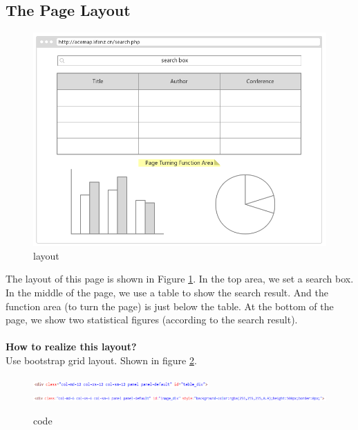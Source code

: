 \documentclass{article}
\begin{document}
	\subsection{The Page Layout}
	\begin{figure}[htb]
		\includegraphics[width=1.0\textwidth]{searchlayout.png}
		\caption{layout}
		\label{searchlayout}
	\end{figure}
	The layout of this page is shown in Figure \ref{searchlayout}. In the top area, we set a search box. In the middle of the page, we use a table to show the search result. And the function area (to turn the page) is just below the table. At the bottom of the page, we show two statistical figures (according to the search result).\\ \\
	\textbf{How to realize this layout?}\\
	Use bootstrap grid layout. Shown in figure \ref{searchlayoutcode}.
	\begin{figure}[htb]
		\includegraphics[width=0.6\textwidth]{searchlayoutcode1.png}\\
		\includegraphics[width=1.0\textwidth]{searchlayoutcode2.png}
		\caption{code}	
		\label{searchlayoutcode}
	\end{figure}
\end{document}
